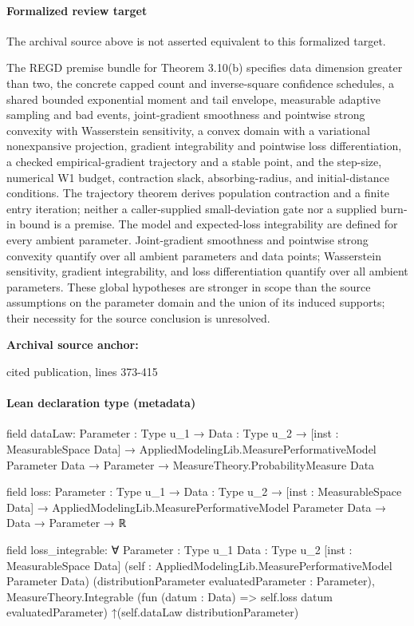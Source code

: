\documentclass[10pt]{article}
\begin{document}
\paragraph{Formalized review target}
The archival source above is not asserted equivalent to this formalized target.
\begin{ReviewVerbatim}
The REGD premise bundle for Theorem 3.10(b) specifies data dimension greater than two, the concrete capped count and inverse-square confidence schedules, a shared bounded exponential moment and tail envelope, measurable adaptive sampling and bad events, joint-gradient smoothness and pointwise strong convexity with Wasserstein sensitivity, a convex domain with a variational nonexpansive projection, gradient integrability and pointwise loss differentiation, a checked empirical-gradient trajectory and a stable point, and the step-size, numerical W1 budget, contraction slack, absorbing-radius, and initial-distance conditions. The trajectory theorem derives population contraction and a finite entry iteration; neither a caller-supplied small-deviation gate nor a supplied burn-in bound is a premise. The model and expected-loss integrability are defined for every ambient parameter. Joint-gradient smoothness and pointwise strong convexity quantify over all ambient parameters and data points; Wasserstein sensitivity, gradient integrability, and loss differentiation quantify over all ambient parameters. These global hypotheses are stronger in scope than the source assumptions on the parameter domain and the union of its induced supports; their necessity for the source conclusion is unresolved.
\end{ReviewVerbatim}

\textbf{Archival source anchor:} {\footnotesize\raggedright cited publication, lines 373-\allowbreak{}415\par}
\paragraph{Lean declaration type (metadata)}
\begin{ReviewVerbatim}
field dataLaw:
{Parameter : Type u_1} →
  {Data : Type u_2} →
    [inst : MeasurableSpace Data] →
      AppliedModelingLib.MeasurePerformativeModel Parameter Data → Parameter → MeasureTheory.ProbabilityMeasure Data

field loss:
{Parameter : Type u_1} →
  {Data : Type u_2} →
    [inst : MeasurableSpace Data] → AppliedModelingLib.MeasurePerformativeModel Parameter Data → Data → Parameter → ℝ

field loss_integrable:
∀ {Parameter : Type u_1} {Data : Type u_2} [inst : MeasurableSpace Data]
  (self : AppliedModelingLib.MeasurePerformativeModel Parameter Data)
  (distributionParameter evaluatedParameter : Parameter),
  MeasureTheory.Integrable (fun (datum : Data) => self.loss datum evaluatedParameter)
    ↑(self.dataLaw distributionParameter)
\end{ReviewVerbatim}
\end{document}
